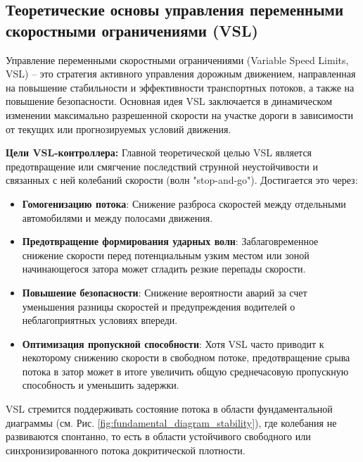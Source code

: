 \documentclass[12pt, a4paper]{article}
\begin{document}
\subsection{Теоретические основы управления переменными скоростными ограничениями (VSL)}
\label{subsec:vsl_theory}

Управление переменными скоростными ограничениями (Variable Speed Limits, VSL) – это стратегия активного управления дорожным движением, направленная на повышение стабильности и эффективности транспортных потоков, а также на повышение безопасности. Основная идея VSL заключается в динамическом изменении максимально разрешенной скорости на участке дороги в зависимости от текущих или прогнозируемых условий движения.

\textbf{Цели VSL-контроллера:}
Главной теоретической целью VSL является предотвращение или смягчение последствий струнной неустойчивости и связанных с ней колебаний скорости (волн "stop-and-go"). Достигается это через:
\begin{itemize}
    \item \textbf{Гомогенизацию потока}: Снижение разброса скоростей между отдельными автомобилями и между полосами движения.
    \item \textbf{Предотвращение формирования ударных волн}: Заблаговременное снижение скорости перед потенциальным узким местом или зоной начинающегося затора может сгладить резкие перепады скорости.
    \item \textbf{Повышение безопасности}: Снижение вероятности аварий за счет уменьшения разницы скоростей и предупреждения водителей о неблагоприятных условиях впереди.
    \item \textbf{Оптимизация пропускной способности}: Хотя VSL часто приводит к некоторому снижению скорости в свободном потоке, предотвращение срыва потока в затор может в итоге увеличить общую среднечасовую пропускную способность и уменьшить задержки.
\end{itemize}
VSL стремится поддерживать состояние потока в области фундаментальной диаграммы (см. Рис. \ref{fig:fundamental_diagram_stability}), где колебания не развиваются спонтанно, то есть в области устойчивого свободного или синхронизированного потока докритической плотности.
\end{document}

